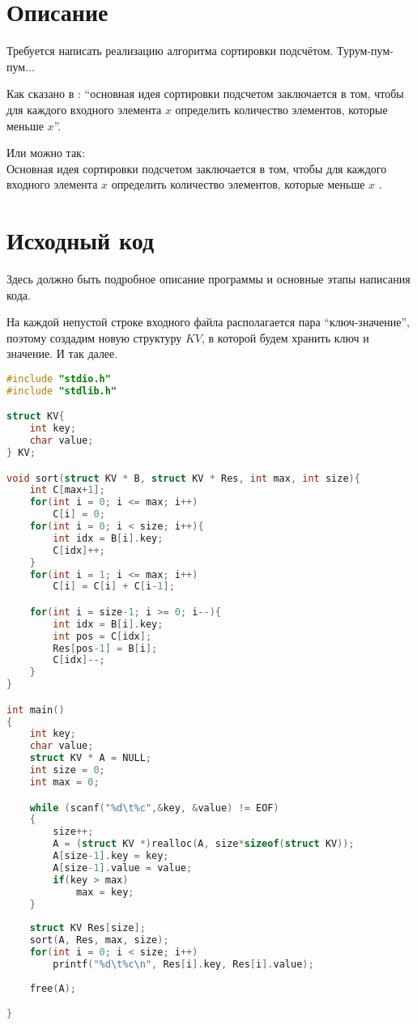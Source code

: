 \section{Описание}
Требуется написать реализацию алгоритма сортировки подсчётом. Турум-пум-пум...

Как сказано в \cite{Kormen}: \enquote{основная идея сортировки подсчетом заключается в том, чтобы для каждого входного 
элемента $x$ определить количество элементов, которые меньше $x$}.

Или можно так:\\
Основная идея сортировки подсчетом заключается в том, чтобы для каждого входного 
элемента $x$ определить количество элементов, которые меньше $x$ \cite{Kormen}.

\pagebreak

\section{Исходный код}
Здесь должно быть подробное описание программы и основные этапы написания кода.

На каждой непустой строке входного файла располагается пара \enquote{ключ-значение}, поэтому создадим новую 
структуру $KV$, в которой будем хранить ключ и значение. И так далее.

\begin{lstlisting}[language=C]
#include "stdio.h"
#include "stdlib.h"

struct KV{
    int key;
    char value;
} KV;

void sort(struct KV * B, struct KV * Res, int max, int size){
    int C[max+1];
    for(int i = 0; i <= max; i++)
        C[i] = 0;
    for(int i = 0; i < size; i++){
        int idx = B[i].key;
        C[idx]++;
    }
    for(int i = 1; i <= max; i++)
        C[i] = C[i] + C[i-1];

    for(int i = size-1; i >= 0; i--){
        int idx = B[i].key;
        int pos = C[idx];
        Res[pos-1] = B[i];
        C[idx]--;
    }
}

int main()
{
    int key;
    char value;
    struct KV * A = NULL;
    int size = 0;
    int max = 0;

    while (scanf("%d\t%c",&key, &value) != EOF)
    {
        size++;
        A = (struct KV *)realloc(A, size*sizeof(struct KV));
        A[size-1].key = key;
        A[size-1].value = value;
        if(key > max)
            max = key;
    }
    
    struct KV Res[size];
    sort(A, Res, max, size);
    for(int i = 0; i < size; i++)
        printf("%d\t%c\n", Res[i].key, Res[i].value);
        
    free(A);

}
    
\end{lstlisting}

